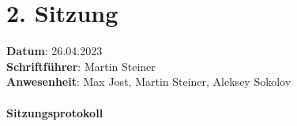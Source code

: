 \section{2. Sitzung}
\label{sec:2_sitzung}

\textbf{Datum}: 26.04.2023\\
\textbf{Schriftführer}: Martin Steiner\\
\textbf{Anwesenheit}: Max Jost, Martin Steiner, Aleksey Sokolov

\paragraph{Sitzungsprotokoll}


